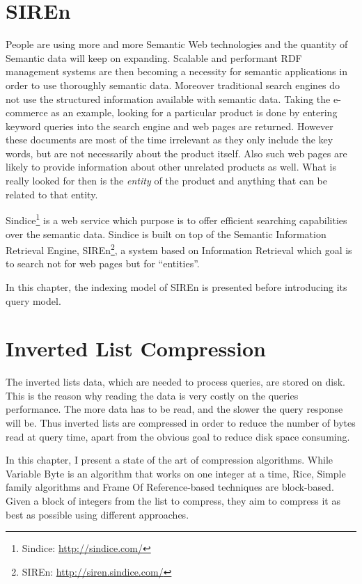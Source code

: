 \chapter{SIREn}{
People are using more and more Semantic Web technologies and the quantity of
Semantic data will keep on expanding. Scalable and performant RDF management
systems are then becoming a necessity for semantic applications in order to use
thoroughly semantic data. Moreover traditional search engines do not use the
structured information available with semantic data. Taking the e-commerce as
an example, looking for a particular product is done by entering keyword
queries into the search engine and web pages are returned. However these
documents are most of the time irrelevant as they only include the key words,
but are not necessarily about the product itself. Also such web pages are
likely to provide information about other unrelated products as well. What is
really looked for then is the \emph{entity} of the product and anything that
can be related to that entity.

Sindice\footnote{Sindice: \url{http://sindice.com/}} is a web service which
purpose is to offer efficient searching capabilities over the semantic data.
Sindice is built on top of the Semantic Information Retrieval Engine,
SIREn\footnote{SIREn: \url{http://siren.sindice.com/}}, a system based on
Information Retrieval which goal is to search not for web pages but for
``entities''.

In this chapter, the indexing model of SIREn is presented before introducing
its query model.}
\label{chap:BG-siren}



\chapter{Inverted List Compression}{
The inverted lists data, which are needed to process queries, are stored on
disk. This is the reason why reading the data is very costly on the queries
performance. The more data has to be read, and the slower the query response
will be. Thus inverted lists are compressed in order to reduce the number of
bytes read at query time, apart from the obvious goal to reduce disk space
consuming.

In this chapter, I present a state of the art of compression algorithms. While
Variable Byte is an algorithm that works on one integer at a time, Rice,
Simple family algorithms and Frame Of Reference-based techniques are
block-based. Given a block of integers from the list to compress, they aim to
compress it as best as possible using different approaches.}
\label{chap:compression:state-of-the-art}


